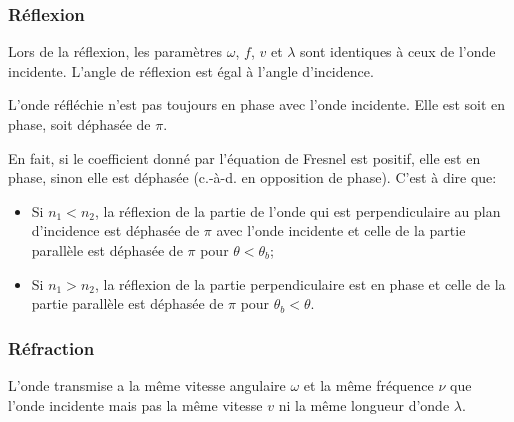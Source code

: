 \subsubsection{Réflexion}

Lors de la réflexion, les paramètres $\omega$, $f$, $v$ et $\lambda$
sont identiques à ceux de l'onde incidente.
L'angle de réflexion est égal à l'angle d'incidence.

L'onde réfléchie n'est pas toujours en phase avec l'onde incidente.
Elle est soit en phase, soit déphasée de $\pi$.

En fait, si le coefficient donné par l'équation de Fresnel est positif,
elle est en phase, sinon elle est déphasée (c.-à-d. en opposition de phase).
C'est à dire que:
\begin{itemize}
  \item Si $n_1 < n_2$, la réflexion de la partie de l'onde
    qui est perpendiculaire au plan
    d'incidence est déphasée de $\pi$ avec l'onde incidente
    et celle de la partie parallèle est déphasée de $\pi$
    pour $\theta < \theta_b$;
  \item Si $n_1 > n_2$, la réflexion de la partie perpendiculaire est
    en phase et celle de la partie parallèle est déphasée de $\pi$
    pour $\theta_b < \theta$.
\end{itemize}


\subsubsection{Réfraction}
L'onde transmise a la même vitesse angulaire $\omega$
et la même fréquence $\nu$ que l'onde incidente
mais pas la même vitesse $v$ ni la même longueur d'onde $\lambda$.

